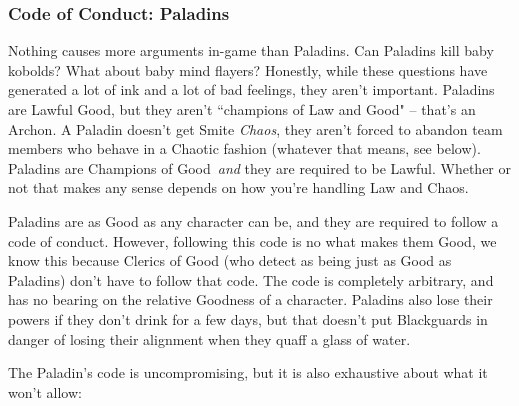 \subsubsection{Code of Conduct: Paladins}
Nothing causes more arguments in-game than Paladins. Can Paladins kill baby kobolds? What about baby mind flayers? Honestly, while these questions have generated a lot of ink and a lot of bad feelings, they aren't important. Paladins are Lawful Good, but they aren't ``champions of Law and Good" -- that's an Archon. A Paladin doesn't get Smite \textit{Chaos}, they aren't forced to abandon team members who behave in a Chaotic fashion (whatever that means, see below). Paladins are Champions of Good\texttrademark\ \textit{and} they are required to be Lawful. Whether or not that makes any sense depends on how you're handling Law and Chaos.

Paladins are as Good as any character can be, and they are required to follow a code of conduct. However, following this code is no what makes them Good, we know this because Clerics of Good (who detect as being just as Good as Paladins) don't have to follow that code. The code is completely arbitrary, and has no bearing on the relative Goodness of a character. Paladins also lose their powers if they don't drink for a few days, but that doesn't put Blackguards in danger of losing their alignment when they quaff a glass of water.

The Paladin's code is uncompromising, but it is also exhaustive about what it won't allow:

